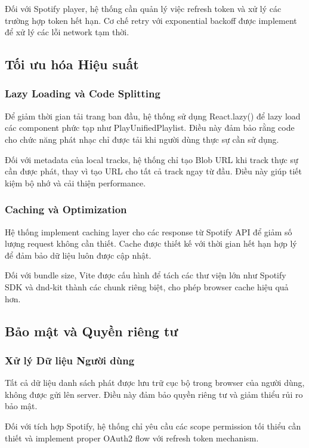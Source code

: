 \documentclass[12pt,a4paper]{article}
\begin{document}
Đối với Spotify player, hệ thống cần quản lý việc refresh token và xử lý các trường hợp token hết hạn. Cơ chế retry với exponential backoff được implement để xử lý các lỗi network tạm thời.

\subsection{Tối ưu hóa Hiệu suất}

\subsubsection{Lazy Loading và Code Splitting}

Để giảm thời gian tải trang ban đầu, hệ thống sử dụng React.lazy() để lazy load các component phức tạp như PlayUnifiedPlaylist. Điều này đảm bảo rằng code cho chức năng phát nhạc chỉ được tải khi người dùng thực sự cần sử dụng.

Đối với metadata của local tracks, hệ thống chỉ tạo Blob URL khi track thực sự cần được phát, thay vì tạo URL cho tất cả track ngay từ đầu. Điều này giúp tiết kiệm bộ nhớ và cải thiện performance.

\subsubsection{Caching và Optimization}

Hệ thống implement caching layer cho các response từ Spotify API để giảm số lượng request không cần thiết. Cache được thiết kế với thời gian hết hạn hợp lý để đảm bảo dữ liệu luôn được cập nhật.

Đối với bundle size, Vite được cấu hình để tách các thư viện lớn như Spotify SDK và dnd-kit thành các chunk riêng biệt, cho phép browser cache hiệu quả hơn.

\subsection{Bảo mật và Quyền riêng tư}

\subsubsection{Xử lý Dữ liệu Người dùng}

Tất cả dữ liệu danh sách phát được lưu trữ cục bộ trong browser của người dùng, không được gửi lên server. Điều này đảm bảo quyền riêng tư và giảm thiểu rủi ro bảo mật.

Đối với tích hợp Spotify, hệ thống chỉ yêu cầu các scope permission tối thiểu cần thiết và implement proper OAuth2 flow với refresh token mechanism.
\end{document}
